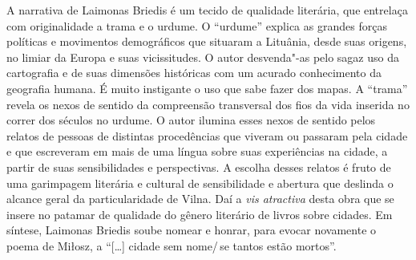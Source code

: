 \begin{multicols}{2}
A narrativa de Laimonas Briedis é um tecido de qualidade literária, que
entrelaça com originalidade a trama e o urdume. O ``urdume'' explica as
grandes forças políticas e movimentos demográficos que situaram a
Lituânia, desde suas origens, no limiar da Europa e suas vicissitudes. O
autor desvenda"-as pelo sagaz uso da cartografia e de suas dimensões
históricas com um acurado conhecimento da geografia humana. É muito
instigante o uso que sabe fazer dos mapas. A ``trama'' revela os nexos de
sentido da compreensão transversal dos fios da vida inserida no correr
dos séculos no urdume. O autor ilumina esses nexos de sentido pelos
relatos de pessoas de distintas procedências que viveram ou passaram
pela cidade e que escreveram em mais de uma língua sobre suas
experiências na cidade, a partir de suas sensibilidades e perspectivas.
A escolha desses relatos é fruto de uma garimpagem literária e cultural
de sensibilidade e abertura que deslinda o alcance geral da
particularidade de Vilna. Daí a \textit{vis atractiva} desta obra que se
insere no patamar de qualidade do gênero literário de livros sobre
cidades. Em síntese, Laimonas Briedis soube nomear e honrar, para evocar
novamente o poema de Miłosz, a ``[\ldots{}] cidade sem nome/\,se tantos estão mortos''.

\bigskip
\noindent{}\textcolor{gray}{\footnotesize{}}
\end{multicols}

\pagebreak
\pagestyle{aylloncat}
\begin{multicols}{2}
\end{multicols}
\pagebreak